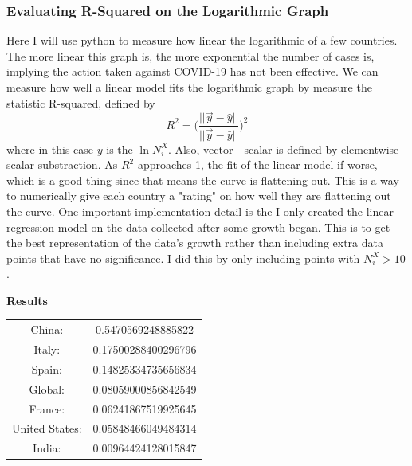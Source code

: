\documentclass{report}
\begin{document}
            \subsubsection{Evaluating R-Squared on the Logarithmic Graph}
                Here I will use python to measure how linear the logarithmic of a few countries. The more linear this graph is, the more exponential the number of cases is, implying the action taken against COVID-19 has not been effective.
                \newline\indent
                We can measure how well a linear model fits the logarithmic graph by measure the statistic R-squared, defined by
                \begin{equation}
                    R^2 = \big(\dfrac{||\vec{y} - \hat{y}||}{||\vec{y} - \bar{y}||}\big)^2
                \end{equation}
                where in this case $y$ is the $\ln N^X_i$. Also, vector - scalar is defined by elementwise scalar substraction. 
                \newline\indent
                As $R^2$ approaches 1, the fit of the linear model if worse, which is a good thing since that means the curve is flattening out. This is a way to numerically give each country a "rating" on how well they are flattening out the curve.
                \newline\indent
                One important implementation detail is the I only created the linear regression model on the data collected after some growth began. This is to get the best representation of the data's growth rather than including extra data points that have no significance. I did this by only including points with $N^X_i > 10$.                
                \newline
                \begin{center}
                    \textbf{Results}
                    \begin{tabular}{||c c||}
                        China: & 0.5470569248885822 \\
                        Italy: & 0.17500288400296796 \\
                        Spain: & 0.14825334735656834 \\
                        Global: & 0.08059000856842549 \\
                        France: & 0.06241867519925645 \\
                        United States: & 0.05848466049484314 \\
                        India: & 0.00964424128015847
                    \end{tabular}
                \end{center}
\end{document}
